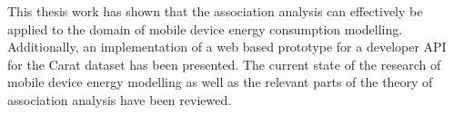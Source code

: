 


This thesis work has shown that the association analysis can effectively be applied to the domain of mobile device energy consumption modelling. Additionally, an implementation of a web based prototype for a developer API for the Carat dataset has been presented. The current state of the research of mobile device energy modelling as well as the relevant parts of the theory of association analysis have been reviewed.

